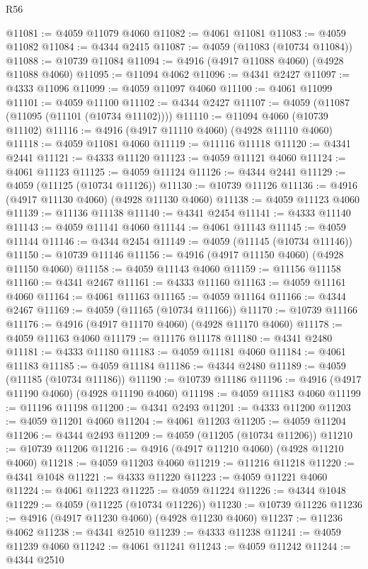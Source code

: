 \begin{lexlean}{R56}
\begin{coremodule}
@11081 := @4059 @11079 @4060
@11082 := @4061 @11081
@11083 := @4059 @11082
@11084 := @4344 @2415
@11087 := @4059 (@11083 (@10734 @11084))
@11088 := @10739 @11084
@11094 := @4916 (@4917 @11088 @4060) (@4928 @11088 @4060)
@11095 := @11094 @4062
@11096 := @4341 @2427
@11097 := @4333 @11096
@11099 := @4059 @11097 @4060
@11100 := @4061 @11099
@11101 := @4059 @11100
@11102 := @4344 @2427
@11107 := @4059 (@11087 (@11095 (@11101 (@10734 @11102))))
@11110 := @11094 @4060 (@10739 @11102)
@11116 := @4916 (@4917 @11110 @4060) (@4928 @11110 @4060)
@11118 := @4059 @11081 @4060
@11119 := @11116 @11118
@11120 := @4341 @2441
@11121 := @4333 @11120
@11123 := @4059 @11121 @4060
@11124 := @4061 @11123
@11125 := @4059 @11124
@11126 := @4344 @2441
@11129 := @4059 (@11125 (@10734 @11126))
@11130 := @10739 @11126
@11136 := @4916 (@4917 @11130 @4060) (@4928 @11130 @4060)
@11138 := @4059 @11123 @4060
@11139 := @11136 @11138
@11140 := @4341 @2454
@11141 := @4333 @11140
@11143 := @4059 @11141 @4060
@11144 := @4061 @11143
@11145 := @4059 @11144
@11146 := @4344 @2454
@11149 := @4059 (@11145 (@10734 @11146))
@11150 := @10739 @11146
@11156 := @4916 (@4917 @11150 @4060) (@4928 @11150 @4060)
@11158 := @4059 @11143 @4060
@11159 := @11156 @11158
@11160 := @4341 @2467
@11161 := @4333 @11160
@11163 := @4059 @11161 @4060
@11164 := @4061 @11163
@11165 := @4059 @11164
@11166 := @4344 @2467
@11169 := @4059 (@11165 (@10734 @11166))
@11170 := @10739 @11166
@11176 := @4916 (@4917 @11170 @4060) (@4928 @11170 @4060)
@11178 := @4059 @11163 @4060
@11179 := @11176 @11178
@11180 := @4341 @2480
@11181 := @4333 @11180
@11183 := @4059 @11181 @4060
@11184 := @4061 @11183
@11185 := @4059 @11184
@11186 := @4344 @2480
@11189 := @4059 (@11185 (@10734 @11186))
@11190 := @10739 @11186
@11196 := @4916 (@4917 @11190 @4060) (@4928 @11190 @4060)
@11198 := @4059 @11183 @4060
@11199 := @11196 @11198
@11200 := @4341 @2493
@11201 := @4333 @11200
@11203 := @4059 @11201 @4060
@11204 := @4061 @11203
@11205 := @4059 @11204
@11206 := @4344 @2493
@11209 := @4059 (@11205 (@10734 @11206))
@11210 := @10739 @11206
@11216 := @4916 (@4917 @11210 @4060) (@4928 @11210 @4060)
@11218 := @4059 @11203 @4060
@11219 := @11216 @11218
@11220 := @4341 @1048
@11221 := @4333 @11220
@11223 := @4059 @11221 @4060
@11224 := @4061 @11223
@11225 := @4059 @11224
@11226 := @4344 @1048
@11229 := @4059 (@11225 (@10734 @11226))
@11230 := @10739 @11226
@11236 := @4916 (@4917 @11230 @4060) (@4928 @11230 @4060)
@11237 := @11236 @4062
@11238 := @4341 @2510
@11239 := @4333 @11238
@11241 := @4059 @11239 @4060
@11242 := @4061 @11241
@11243 := @4059 @11242
@11244 := @4344 @2510

\end{coremodule}
\end{lexlean}
